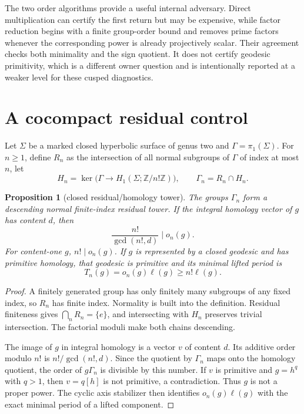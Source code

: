 \documentclass[11pt]{article}
\newtheorem{proposition}[theorem]{Proposition}
\theoremstyle{definition}
\theoremstyle{remark}
\newcommand{\ZZ}{\mathbb Z}
\begin{document}
The two order algorithms provide a useful internal adversary. Direct multiplication can certify the first return but may be expensive, while factor reduction begins with a finite group-order bound and removes prime factors whenever the corresponding power is already projectively scalar. Their agreement checks both minimality and the sign quotient. It does not certify geodesic primitivity, which is a different owner question and is intentionally reported at a weaker level for these cusped diagnostics.

\section{A cocompact residual control}

Let $\Sigma$ be a marked closed hyperbolic surface of genus two and $\Gamma=\pi_1(\Sigma)$. For $n\geq1$, define $R_n$ as the intersection of all normal subgroups of $\Gamma$ of index at most $n$, let
\[
H_n=\ker\bigl(\Gamma\to H_1(\Sigma;\ZZ/n!\ZZ)\bigr),
\qquad
\Gamma_n=R_n\cap H_n.
\]

\begin{proposition}[closed residual/homology tower]\label{prop:closed}
The groups $\Gamma_n$ form a descending normal finite-index residual tower. If the integral homology vector of $g$ has content $d$, then
\[
\frac{n!}{\gcd(n!,d)}\mid o_n(g).
\]
For content-one $g$, $n!\mid o_n(g)$. If $g$ is represented by a closed geodesic and has primitive homology, that geodesic is primitive and its minimal lifted period is
\[
T_n(g)=o_n(g)\ell(g)\geq n!\ell(g).
\]
\end{proposition}

\begin{proof}
A finitely generated group has only finitely many subgroups of any fixed index, so $R_n$ has finite index. Normality is built into the definition. Residual finiteness gives $\bigcap_nR_n=\{e\}$, and intersecting with $H_n$ preserves trivial intersection. The factorial moduli make both chains descending.

The image of $g$ in integral homology is a vector $v$ of content $d$. Its additive order modulo $n!$ is $n!/\gcd(n!,d)$. Since the quotient by $\Gamma_n$ maps onto the homology quotient, the order of $g\Gamma_n$ is divisible by this number. If $v$ is primitive and $g=h^q$ with $q>1$, then $v=q[h]$ is not primitive, a contradiction. Thus $g$ is not a proper power. The cyclic axis stabilizer then identifies $o_n(g)\ell(g)$ with the exact minimal period of a lifted component.
\end{proof}
\end{document}
